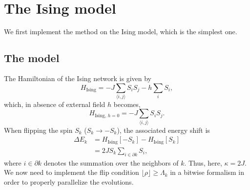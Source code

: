 \section{The Ising model}
We first implement the method on the Ising model, which is the simplest one.
\subsection{The model}
The Hamiltonian of the Ising network is given by
\begin{equation*}
  H_\text{Ising}=-J\sum_{\langle i,j \rangle}S_iS_j -h \sum_i S_i,
\end{equation*}
which, in absence of external field $h$ becomes,
\begin{equation}
  H_{\text{Ising, } h=0}=-J\sum_{\langle i,j \rangle}S_iS_j.
  \label{eq:ising}
\end{equation}
When flipping the spin $S_k$ ($S_k \to - S_k$), the associated energy shift is
\begin{equation}
\begin{aligned}
  \Delta E_k &= H_\text{Ising}\left[-S_k\right]-H_\text{Ising}\left[S_k\right] \\
  &= 2J S_k \sum_{i \in \partial k} S_i,
\end{aligned}
\label{eq:DeltaE_ising}
\end{equation}
where $i \in \partial k$ denotes the summation over the neighbors of $k$. Thus, here, $\kappa=2J$. We now need to implement the flip condition $\lfloor \rho \rfloor \geq \Lambda_k$ in a bitwise formalism in order to properly parallelize the evolutions.
